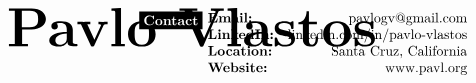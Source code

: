 \documentclass[paper=a4,fontsize=10pt]{article} %
\def \nameColWidth {0.165\textwidth}		%
\def \mainColWidth {0.8\textwidth}		%
\def \leftColWidth {0.1\textwidth}		%
\begin{document}
	\setlength{\abovedisplayskip}{0pt}
	\setlength{\belowdisplayskip}{0pt}
	\setlength{\abovedisplayshortskip}{0pt}
	\setlength{\belowdisplayshortskip}{0pt}
\begin{align*}
	&
	\begin{array}{ll}
	\parbox[t]{\nameColWidth}{%
		\text{\fontsize{40}{48}\selectfont \textbf{Pavlo Vlastos}}
	}%
	&
	\parbox{\mainColWidth}{%
		\hfill $\begin{array}[t]{ll}
		\parbox[c]{\leftColWidth}{%
			\hfill\colorbox{black}{\color{white}{\textbf{Contact}}}
		}%
		&
		\begin{array}[t]{lr}
		\textbf{Email:} & \text{pavlogv@gmail.com}\\
		\textbf{LinkedIn:} & \text{linkedin.com/in/pavlo-vlastos}\\
		\textbf{Location:} & \text{Santa Cruz, California}\\
		\textbf{Website:} & \text{www.pavl.org}\\
		\end{array}
		\end{array}$
	}%
	\end{array}
\end{align*}
\end{document}
